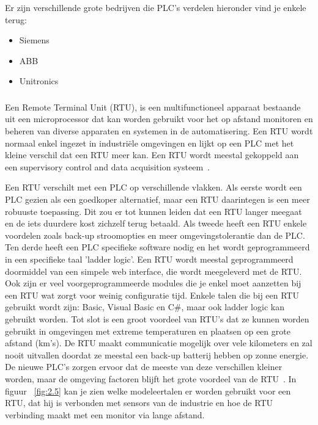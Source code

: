 Er zijn verschillende grote bedrijven die PLC's verdelen hieronder vind je enkele terug:
\begin{itemize}
    \item Siemens
    \item ABB
    \item Unitronics
\end{itemize}

\subsubsection{}
\label{subsubsec:RTU}
Een Remote Terminal Unit (RTU), is een multifunctioneel apparaat bestaande uit een microprocessor dat kan worden gebruikt voor het op afstand monitoren en beheren van diverse apparaten en systemen in de automatisering. Een RTU wordt normaal enkel ingezet in industriële omgevingen en lijkt op een PLC met het kleine verschil dat een RTU meer kan. Een RTU wordt meestal gekoppeld aan een supervisory control and data acquisition systeem~\autocite{Realpars2018}. 

Een RTU verschilt met een PLC op verschillende vlakken. Als eerste wordt een PLC gezien als een goedkoper alternatief, maar een RTU daarintegen is een meer robuuste toepassing. Dit zou er tot kunnen leiden dat een RTU langer meegaat en de iets duurdere kost zichzelf terug betaald. Als tweede heeft een RTU enkele voordelen zoals back-up stroomopties en meer omgevingstolerantie dan de PLC. Ten derde heeft een PLC specifieke software nodig en het wordt geprogrammeerd in een specifieke taal 'ladder logic'. Een RTU wordt meestal geprogrammeerd doormiddel van een simpele web interface, die wordt meegeleverd met de RTU. Ook zijn er veel voorgeprogrammeerde modules die je enkel moet aanzetten bij een RTU wat zorgt voor weinig configuratie tijd. Enkele talen die bij een RTU gebruikt wordt zijn: Basic, Visual Basic en C\#, maar ook ladder logic kan gebruikt worden. Tot slot is een groot voordeel van RTU's dat ze kunnen worden gebruikt in omgevingen met extreme temperaturen en plaatsen op een grote afstand (km's). De RTU maakt communicatie mogelijk over vele kilometers en zal nooit uitvallen doordat ze meestal een back-up batterij hebben op zonne energie. De nieuwe PLC's zorgen ervoor dat de meeste van deze verschillen kleiner worden, maar de omgeving factoren blijft het grote voordeel van de RTU~\autocite{Realpars2018}. In figuur ~\ref{fig:2.5} kan je zien welke modeleertalen er worden gebruikt voor een RTU, dat hij is verbonden met sensors van de industrie en hoe de RTU verbinding maakt met een monitor via lange afstand.

